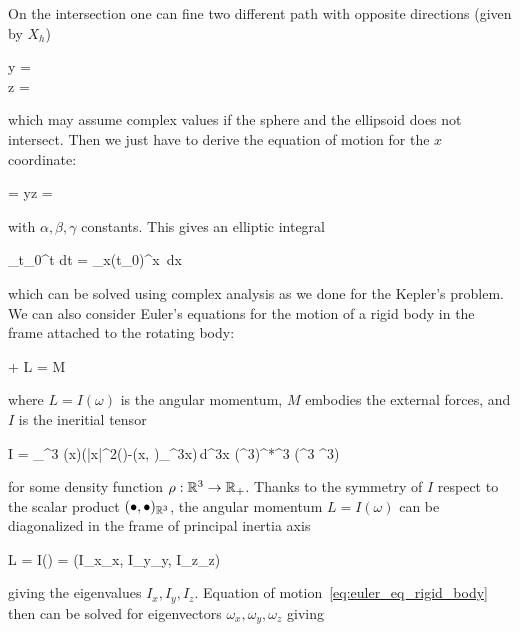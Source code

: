 \documentclass[main.tex]{subfiles}
\begin{document}
\begin{example}
\begin{figure}[H]
		\label{fig:rigid_body_phase_space}
	\end{figure}
	On the intersection one can fine two different path with opposite directions (given by $X_h$)
	\begin{eqalign}
		\begin{cases}
			y = \pm {}\\
			z = \pm {}
		\end{cases}
	\end{eqalign}
	which may assume complex values if the sphere and the ellipsoid does not intersect. Then we just have to derive the equation of motion for the $x$ coordinate:
	\begin{eqalign}
		 = yz = \sqrt{\alpha+\beta x^2 + \gamma x^4}
	\end{eqalign}
	with $\alpha, \beta, \gamma$ constants. This gives an elliptic integral
	\begin{eqalign}
		\int_{t_0}^t dt = \int_{x(t_0)}^x \frac{1}{}\,dx
	\end{eqalign}
	which can be solved using complex analysis as we done for the Kepler's problem.\\
	We can also consider Euler's equations for the motion of a rigid body in the frame attached to the rotating body:
	\begin{eqalign}
	\label{eq:euler_eq_rigid_body}
		 + \omega\times L = M
	\end{eqalign}
	where $L=I(\omega)$ is  the angular momentum, $M$ embodies the external forces, and $I$ is the ineritial tensor
	\begin{eqalign}
		I = \int_{\R^3} \rho(\vec x)\big(|\vec x|^2\id(\bullet)-(\vec x, \bullet)_{\R^3}\tens \vec x\big)\,d^3x \in (\R^3)^*\tens \R^3 \iso \Hom(\R^3 \to \R^3)
	\end{eqalign}
	for some density function $\rho : \mathbb{R}^3\to\mathbb{R}_+$. Thanks to the symmetry of $I$ respect to the scalar product $(\bullet, \bullet)_{\mathbb{R}^3}$, the angular momentum $L=I(\omega)$ can be diagonalized in the frame of principal inertia axis
	\begin{eqalign}
		L = I(\omega) = (I_x\omega_x, I_y\omega_y, I_z\omega_z)
	\end{eqalign}
	giving the eigenvalues $I_x, I_y, I_z$. Equation of motion~\eqref{eq:euler_eq_rigid_body} then can be solved for eigenvectors $\omega_x, \omega_y, \omega_z$ giving

\end{example}
\end{document}
